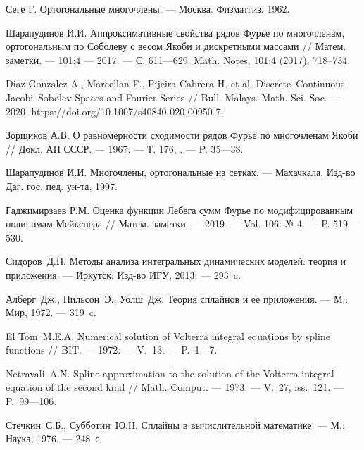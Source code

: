 \begin{thebibliography}{99}
{Сеге Г.}
Ортогональные многочлены.
--- Москва. Физматгиз. 1962.




Шарапудинов И.И.
Аппроксимативные свойства рядов Фурье по многочленам, ортогональным по Соболеву с весом Якоби и дискретными массами
//
Матем. заметки.
--- 101:4
--- 2017.
--- С. 611---629.
Math. Notes, 101:4 (2017), 718–734.




Diaz-Gonzalez A., Marcellan F., Pijeira-Cabrera H. et al.
Discrete--Continuous Jacobi--Sobolev Spaces and Fourier Series
//
Bull. Malays. Math. Sci. Soc.
--- 2020. https://doi.org/10.1007/s40840-020-00950-7.




Зорщиков А.В.
О равномерности сходимости рядов Фурье по многочленам Якоби
//
Докл. АН СССР.
--- 1967.
--- Т. 176, .
--- P. 35---38.




{Шарапудинов И.И.}
Многочлены, ортогональные на сетках.
--- Махачкала. Изд-во Даг. гос. пед. ун-та, 1997.




{Гаджимирзаев Р.М.}
Оценка функции Лебега сумм Фурье по модифицированным полиномам Мейкснера
//
Матем. заметки.
--- 2019.
--- Vol. 106. № 4.
--- P. 519---530.






Сидоров~Д.Н.
Методы анализа интегральных динамических моделей: теория и приложения.
--- Иркутск: Изд-во ИГУ, 2013.
--- 293~c.




Алберг~Дж., Нильсон~Э., Уолш~Дж.
Теория сплайнов и ее приложения.
--- М.: Мир, 1972.
--- 319~c.




El Tom~M.E.A.
Numerical solution of Volterra integral equations by spline functions
//
BIT.
--- 1972.
--- V.~13.
--- P.~1---7.




Netravali~A.N.
Spline approximation to the solution of the Volterra integral equation of the second kind
//
Math. Comput.
--- 1973.
--- V.~27, iss.~121.
--- P.~99---106.




Стечкин~С.Б., Субботин~Ю.Н.
Сплайны в вычислительной математике.
--- М.: Наука, 1976.
--- 248~с.





\end{thebibliography}
